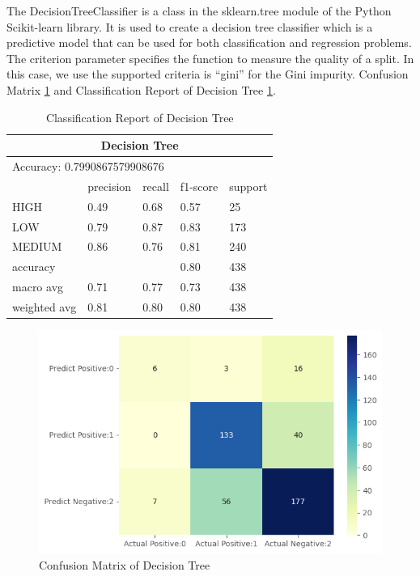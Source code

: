 The DecisionTreeClassifier is a class in the sklearn.tree module of the Python Scikit-learn library. It is used to create a decision tree classifier which is a predictive model that can be used for both classification and regression problems. The criterion parameter specifies the function to measure the quality of a split. In this case, we use the supported criteria is “gini” for the Gini impurity.
Confusion Matrix \ref{cmdt} and Classification Report of Decision Tree \ref{tabledt}.
\begin{table}[H]\centering
    \begin{tabular}{@{}lllll@{}}
    \toprule
    \multicolumn{5}{c}{Decision Tree}                 \\ \midrule
    \multicolumn{5}{l}{Accuracy: 0.7990867579908676}       \\\midrule
                 & precision & recall & f1-score & support \\
    HIGH         & 0.49      & 0.68   & 0.57     & 25      \\ 
    LOW          & 0.79      & 0.87   & 0.83     & 173     \\
    MEDIUM       & 0.86      & 0.76   & 0.81     & 240     \\
    accuracy     &           &        & 0.80     & 438     \\
    macro avg    & 0.71      & 0.77   & 0.73     & 438     \\
    weighted avg & 0.81      & 0.80   & 0.80     & 438     \\ \bottomrule
    \end{tabular}
    \caption{Classification Report of Decision Tree}
    \label{tabledt}
    \end{table}

    \begin{figure}[H]
        \includegraphics[scale=0.7]{imgs/nb_cm.png}
        \centering
        \caption{Confusion Matrix of Decision Tree}
        \label{cmdt}
    \end{figure}